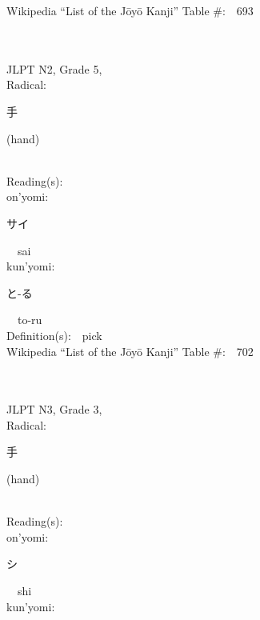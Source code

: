 \begin{multicols}{2}
Wikipedia ``List of the J\=oy\=o Kanji'' Table \#:\ \ 693 \\
\ \ \\
{\fontsize{34pt}{40pt}  }\ \ \\  %
{JLPT N2, Grade 5, \\Radical:\ \ {\begin{CJK}{UTF8}{min} 手 \end{CJK}} (hand) } \\
Reading(s):\ \ \\
{\hspace*{1em}}on'yomi:\ \ \\
{\hspace*{2em}}{\begin{CJK}{UTF8}{min} サイ \end{CJK}}\ \ sai\ \ \\
{\hspace*{1em}}kun'yomi:\ \ \\
{\hspace*{2em}}{\begin{CJK}{UTF8}{min} と-る \end{CJK}}\ \ to-ru\ \ \\
Definition(s):\ \ pick \\
Wikipedia ``List of the J\=oy\=o Kanji'' Table \#:\ \ 702 \\
\ \ \\
{\fontsize{34pt}{40pt}  }\ \ \\  %
{JLPT N3, Grade 3, \\Radical:\ \ {\begin{CJK}{UTF8}{min} 手 \end{CJK}} (hand) } \\
Reading(s):\ \ \\
{\hspace*{1em}}on'yomi:\ \ \\
{\hspace*{2em}}{\begin{CJK}{UTF8}{min} シ \end{CJK}}\ \ shi\ \ \\
{\hspace*{1em}}kun'yomi:\ \ \\

\end{multicols}
